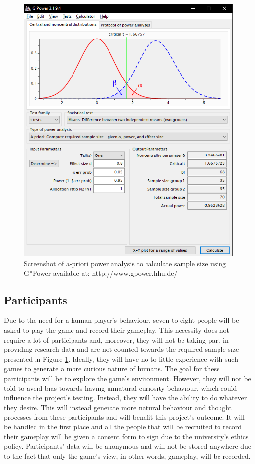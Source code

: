 \documentclass[journal]{IEEEtran}
\begin{document}
\begin{figure}
	\includegraphics[width=\linewidth]{GPower.PNG}
	\caption{Screenshot of a-priori power analysis to calculate sample size using G*Power available at: http://www.gpower.hhu.de/}
	\label{fig:gpower}
\end{figure}

\subsection{Participants} %
Due to the need for a human player's behaviour, seven to eight people will be asked to play the game and record their gameplay. This necessity does not require a lot of participants and, moreover, they will not be taking part in providing research data and are not counted towards the required sample size presented in Figure \ref{fig:gpower}. Ideally, they will have no to little experience with such games to generate a more curious nature of humans. The goal for these participants will be to explore the game's environment. However, they will not be told to avoid bias towards having unnatural curiosity behaviour, which could influence the project's testing. Instead, they will have the ability to do whatever they desire. This will instead generate more natural behaviour and thought processes from these participants and will benefit this project's outcome. It will be handled in the first place and all the people that will be recruited to record their gameplay will be given a consent form to sign due to the university's ethics policy. Participants' data will be anonymous and will not be stored anywhere due to the fact that only the game's view, in other words, gameplay, will be recorded.
\end{document}
